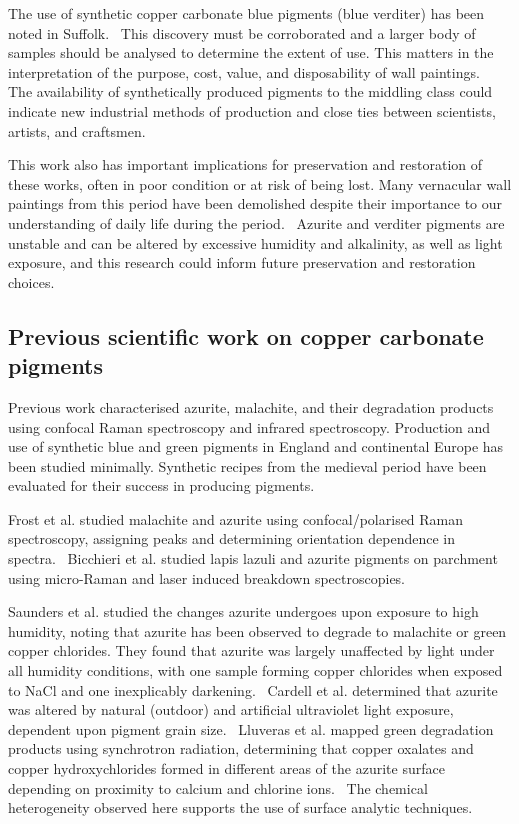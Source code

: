 The use of synthetic copper carbonate blue pigments (blue verditer) has been noted in Suffolk.~\autocite{Baird_thesis, Kirkham_thesis} This discovery must be corroborated and a larger body of samples should be analysed to determine the extent of use. This matters in the interpretation of the purpose, cost, value, and disposability of wall paintings.~\autocite{Baird_thesis,Davies_book} The availability of synthetically produced pigments to the middling class could indicate new industrial methods of production and close ties between scientists, artists, and craftsmen. 

This work also has important implications for preservation and restoration of these works, often in poor condition or at risk of being lost. Many vernacular wall paintings from this period have been demolished despite their importance to our understanding of daily life during the period.~\autocite{Davies_book,Hamling_book,Benton1,Benton2} Azurite and verditer pigments are unstable and can be altered by excessive humidity and alkalinity, as well as light exposure, and this research could inform future preservation and restoration choices.~\autocite{Saunders,Cardell,Lluveras,Mattei,Dei}


\subsection[Previous scientific work on copper carbonate pigments]{Previous scientific work on copper carbonate pigments}
\label{subsection1.1.5}

Previous work characterised azurite, malachite, and their degradation products using confocal Raman spectroscopy and infrared spectroscopy. Production and use of synthetic blue and green pigments in England and continental Europe has been studied minimally. Synthetic recipes from the medieval period have been evaluated for their success in producing pigments.

Frost et al. studied malachite and azurite using confocal/polarised Raman spectroscopy, assigning peaks and determining orientation dependence in spectra.~\autocite{Frost} Bicchieri et al. studied lapis lazuli and azurite pigments on parchment using micro-Raman and laser induced breakdown spectroscopies.~\autocite{Bicchieri} 

Saunders et al. studied the changes azurite undergoes upon exposure to high humidity, noting that azurite has been observed to degrade to malachite or green copper chlorides. They found that azurite was largely unaffected by light under all humidity conditions, with one sample forming copper chlorides when exposed to NaCl and one inexplicably darkening.~\autocite{Saunders} Cardell et al. determined that azurite was altered by natural (outdoor) and artificial ultraviolet light exposure, dependent upon pigment grain size.~\autocite{Cardell} Lluveras et al. mapped green degradation products using synchrotron radiation, determining that copper oxalates and copper hydroxychlorides formed in different areas of the azurite surface depending on proximity to calcium and chlorine ions.~\autocite{Lluveras} The chemical heterogeneity observed here supports the use of surface analytic techniques.

